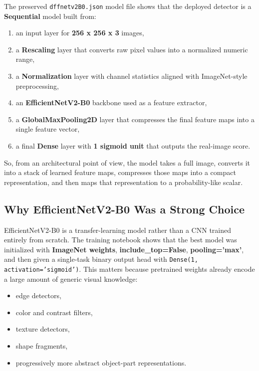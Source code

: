 \documentclass[11pt]{article}
\begin{document}
The preserved \texttt{dffnetv2B0.json} model file shows that the deployed detector is a \textbf{Sequential} model built from:
\begin{enumerate}[leftmargin=1.5em]
    \item an input layer for \textbf{256 x 256 x 3} images,
    \item a \textbf{Rescaling} layer that converts raw pixel values into a normalized numeric range,
    \item a \textbf{Normalization} layer with channel statistics aligned with ImageNet-style preprocessing,
    \item an \textbf{EfficientNetV2-B0} backbone used as a feature extractor,
    \item a \textbf{GlobalMaxPooling2D} layer that compresses the final feature maps into a single feature vector,
    \item a final \textbf{Dense} layer with \textbf{1 sigmoid unit} that outputs the real-image score.
\end{enumerate}

So, from an architectural point of view, the model takes a full image, converts it into a stack of learned feature maps, compresses those maps into a compact representation, and then maps that representation to a probability-like scalar.

\subsection{Why EfficientNetV2-B0 Was a Strong Choice}

EfficientNetV2-B0 is a transfer-learning model rather than a CNN trained entirely from scratch. The training notebook shows that the best model was initialized with \textbf{ImageNet weights}, \textbf{include\_top=False}, \textbf{pooling='max'}, and then given a single-task binary output head with \texttt{Dense(1, activation='sigmoid')}. This matters because pretrained weights already encode a large amount of generic visual knowledge:
\begin{itemize}[leftmargin=1.5em]
    \item edge detectors,
    \item color and contrast filters,
    \item texture detectors,
    \item shape fragments,
    \item progressively more abstract object-part representations.
\end{itemize}
\end{document}
